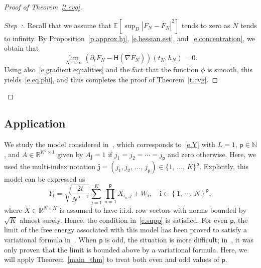 \documentclass[10pt]{amsart}
\theoremstyle{definition}\newtheorem{defi}[theo]{Definition}\newtheorem{rema}[theo]{Remark}\newtheorem{exam}[theo]{Example}\newtheorem{exem}[theo]{Example}\newtheorem{nota}[theo]{Notation}
\newcommand{\N}{\mathbb{N}}
\newcommand{\R}{\mathbb{R}}
\newcommand{\E}{\mathbb{E}}
\newcommand{\bfj}{\mathbf{j}}
\newcommand{\bfi}{\mathbf{i}}
\renewcommand{\H}{\mathsf{H}}
\newcommand{\sfp}{\mathsf{p}}
\renewcommand{\bar}{\overline}
\newcommand{\Ll}{\left}
\newcommand{\Rr}{\right}
\newcounter{stepcount}
\newenvironment{step}{\refstepcounter{stepcount}\begin{proof}[Step~\thestepcount:]}{\let\qed\relax\end{proof}}
\begin{document}
\begin{proof}[Proof of Theorem~\ref{t.cvg}]
\begin{step}\label{proof-the5.1-step3}
Recall that we assume that $\E \Ll[\sup_D |F_N - \bar F_N|^2 \Rr] $ tends to zero as $N$ tends to infinity. By Proposition~\ref{p.approx.hj}, \eqref{e.hessian.est}, and~\eqref{e.concentration}, we obtain that
\begin{equation*}
\lim_{N \to \infty} \Ll(\partial_t\bar F_N-\H(\nabla\bar F_N)\Rr)(t_N,h_N) = 0.
\end{equation*}
Using also~\eqref{e.gradient.equalities} and the fact that the function $\phi$ is smooth, this yields~\eqref{e.eq.phi}, and thus completes the proof of Theorem~\ref{t.cvg}.\qedhere
\end{step}\let\qed\relax
\end{proof}

\subsection{Application}\label{s.app}
We study the model considered in~\cite{luneau2019mutual}, which corresponds to~\eqref{e.Y} with $L=1$, $\sfp\in\N$, and $A\in\R^{K^\sfp\times 1}$ given by $A_{\bfj}=1$ if $j_1=j_2=\cdots = j_\sfp$ and zero otherwise. Here, we used the multi-index notation $\bfj=(j_1,j_2,\,\dots,\,j_\sfp)\in \{1,\,\dots,\,K\}^\sfp$. Explicitly, this model can be expressed as
\begin{equation}\label{e.special}
Y_{\bfi} = \sqrt{\frac{2t}{N^{\sfp-1}}} \sum_{j=1}^K\prod_{n=1}^\sfp X_{i_n, j}+W_{\bfi},\quad \bfi \in \left\{1,\,\cdots,\,N\right\}^\sfp,
\end{equation}
where $X\in \R^{N\times K}$ is assumed to have i.i.d. row vectors {with norms bounded by $\sqrt{K}$ almost surely. Hence, the condition in~\eqref{e.supp} is satisfied.} For even $\sfp$, the limit of the free energy associated with this model has been proved to satisfy a variational formula in~\cite{luneau2019mutual}. When $\sfp$ is odd, the situation is more difficult; in~\cite{HBJ}, it was only proven that the limit is bounded above by a variational formula. Here, we will apply Theorem~\ref{main_thm} to treat both even and odd values of $\sfp$.
\end{document}
